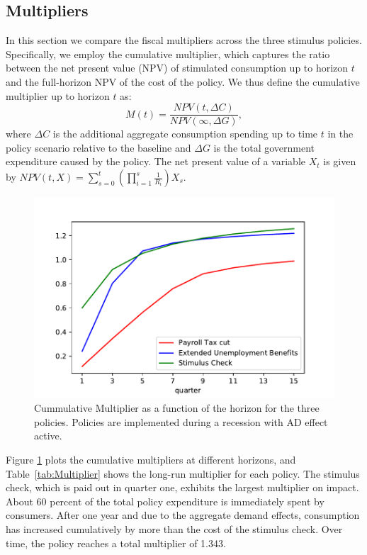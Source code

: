 \documentclass[../HAFiscal]{subfiles}
\begin{document}
\subsection{Multipliers}
\label{sec:multipliers}

In this section we compare the fiscal multipliers across the three stimulus policies. Specifically, we employ the cumulative multiplier, which captures the ratio between the net present value (NPV) of stimulated consumption up to horizon $t$ and the full-horizon NPV of the cost of the policy. We thus define the cumulative multiplier up to horizon $t$ as:
\begin{equation*}
	M(t) = \frac{NPV(t,\Delta C)}{NPV (\infty,\Delta G)},
\end{equation*}
where $\Delta C$ is the additional aggregate consumption spending up to time $t$ in the policy scenario relative to the baseline and $\Delta G$ is the total government expenditure caused by the policy. The net present value of a variable $X_t$ is given by 
$NPV(t,X) = \sum_{s=0}^{t} \left( \prod_{i=1}^{s} \frac{1}{R_i} \right) X_s$. 

\begin{figure}[t]
	\centering
	\includegraphics[width=0.8\linewidth]{Code/HA-Models/FromPandemicCode/Figures/Cummulative_multipliers}
	\caption{Cummulative Multiplier as a function of the horizon for the three policies. Policies are implemented during a recession with AD effect active.}
	\label{fig:cumulativemultipliers}
\end{figure}

Figure \ref{fig:cumulativemultipliers} plots the cumulative multipliers at different horizons, and Table~\ref{tab:Multiplier} shows the long-run multiplier for each policy. The stimulus check, which is paid out in quarter one, exhibits the largest multiplier on impact. About 60 percent of the total policy expenditure is immediately spent by consumers. After one year and due to the aggregate demand effects, consumption has increased cumulatively by more than the cost of the stimulus check. Over time, the policy reaches a total multiplier of 1.343.
\end{document}
